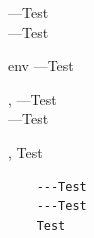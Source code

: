 \documentclass[doc2]{ltxdoc}
\begin{document}
\noindent
\DescribeMacro{\DescribeMacro}
    ---Test\\
    ---Test

\begin{environment}{env}
    ---Test
\end{environment}
\begin{macro}{\hey,\you}
    ---Test\\
    ---Test
\end{macro}
\begin{macro}{\hey,\you}
     Test
\end{macro}

\begin{verbatim}
    ---Test
    ---Test
    Test
\end{verbatim}
\end{document}
